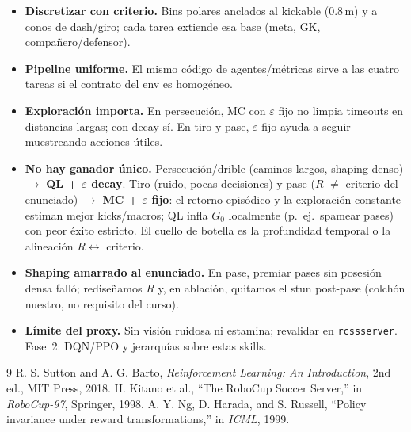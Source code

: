 \documentclass[11pt,a4paper]{article}
\begin{document}
\begin{itemize}
    \item \textbf{Discretizar con criterio.} Bins polares anclados al kickable ($0.8$\,m) y a conos de dash/giro; cada tarea extiende esa base (meta, GK, compañero/defensor).
    \item \textbf{Pipeline uniforme.} El mismo código de agentes/métricas sirve a las cuatro tareas si el contrato del env es homogéneo.
    \item \textbf{Exploración importa.} En persecución, MC con $\varepsilon$ fijo no limpia timeouts en distancias largas; con decay sí. En tiro y pase, $\varepsilon$ fijo ayuda a seguir muestreando acciones útiles.
    \item \textbf{No hay ganador único.} Persecución/drible (caminos largos, shaping denso) $\rightarrow$ \textbf{QL + $\varepsilon$ decay}.
    Tiro (ruido, pocas decisiones) y pase ($R$ $\neq$ criterio del enunciado) $\rightarrow$ \textbf{MC + $\varepsilon$ fijo}: el retorno episódico y la exploración constante estiman mejor kicks/macros; QL infla $G_0$ localmente (p.\ ej.\ spamear pases) con peor éxito estricto.
    El cuello de botella es la profundidad temporal o la alineación $R\leftrightarrow$ criterio.
    \item \textbf{Shaping amarrado al enunciado.} En pase, premiar pases sin posesión densa falló; rediseñamos $R$ y, en ablación, quitamos el stun post-pase (colchón nuestro, no requisito del curso).
    \item \textbf{Límite del proxy.} Sin visión ruidosa ni estamina; revalidar en \texttt{rcssserver}. Fase~2: DQN/PPO y jerarquías sobre estas skills.
\end{itemize}

\begin{thebibliography}{9}
R. S. Sutton and A. G. Barto, \textit{Reinforcement Learning: An Introduction}, 2nd ed., MIT Press, 2018.
H. Kitano et al., ``The RoboCup Soccer Server,'' in \textit{RoboCup-97}, Springer, 1998.
A. Y. Ng, D. Harada, and S. Russell, ``Policy invariance under reward transformations,'' in \textit{ICML}, 1999.
\end{thebibliography}
\end{document}
